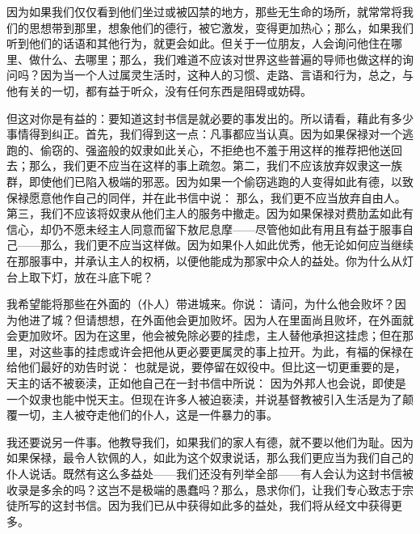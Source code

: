 因为如果我们仅仅看到他们坐过或被囚禁的地方，那些无生命的场所，就常常将我们的思想带到那里，想象他们的德行，被它激发，变得更加热心；那么，如果我们听到他们的话语和其他行为，就更会如此。但关于一位朋友，人会询问他住在哪里、做什么、去哪里；那么，我们难道不应该对世界这些普遍的导师也做这样的询问吗？因为当一个人过属灵生活时，这种人的习惯、走路、言语和行为，总之，与他有关的一切，都有益于听众，没有任何东西是阻碍或妨碍。\par

但这对你是有益的：要知道这封书信是就必要的事发出的。所以请看，藉此有多少事情得到纠正。首先，我们得到这一点：凡事都应当认真。因为如果保禄对一个逃跑的、偷窃的、强盗般的奴隶如此关心，不拒绝也不羞于用这样的推荐把他送回去；那么，我们更不应当在这样的事上疏忽。第二，我们不应该放弃奴隶这一族群，即使他们已陷入极端的邪恶。因为如果一个偷窃逃跑的人变得如此有德，以致保禄愿意他作自己的同伴，并在此书信中说： 那么，我们更不应当放弃自由人。第三，我们不应该将奴隶从他们主人的服务中撤走。因为如果保禄对费肋孟如此有信心，却仍不愿未经主人同意而留下敖尼息摩——尽管他如此有用且有益于服事自己——那么，我们更不应当这样做。因为如果仆人如此优秀，他无论如何应当继续在那服事中，并承认主人的权柄，以便他能成为那家中众人的益处。你为什么从灯台上取下灯，放在斗底下呢？\par

我希望能将那些在外面的（仆人）带进城来。你说： 请问，为什么他会败坏？因为他进了城？但请想想，在外面他会更加败坏。因为人在里面尚且败坏，在外面就会更加败坏。因为在这里，他会被免除必要的挂虑，主人替他承担这挂虑；但在那里，对这些事的挂虑或许会把他从更必要更属灵的事上拉开。为此，有福的保禄在给他们最好的劝告时说： 也就是说，要停留在奴役中。但比这一切更重要的是，天主的话不被亵渎，正如他自己在一封书信中所说： 因为外邦人也会说，即使是一个奴隶也能中悦天主。但现在许多人被迫亵渎，并说基督教被引入生活是为了颠覆一切，主人被夺走他们的仆人，这是一件暴力的事。\par

我还要说另一件事。他教导我们，如果我们的家人有德，就不要以他们为耻。因为如果保禄，最令人钦佩的人，如此为这个奴隶说话，那么我们更应当为我们自己的仆人说话。既然有这么多益处——我们还没有列举全部——有人会认为这封书信被收录是多余的吗？这岂不是极端的愚蠢吗？那么，恳求你们，让我们专心致志于宗徒所写的这封书信。因为我们已从中获得如此多的益处，我们将从经文中获得更多。\par

